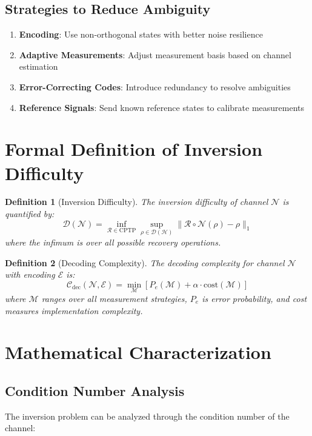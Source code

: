\documentclass[12pt]{article}
\newtheorem{definition}{Definition}
\begin{document}
\subsection{Strategies to Reduce Ambiguity}
\begin{enumerate}
    \item \textbf{Encoding}: Use non-orthogonal states with better noise resilience
    \item \textbf{Adaptive Measurements}: Adjust measurement basis based on channel estimation
    \item \textbf{Error-Correcting Codes}: Introduce redundancy to resolve ambiguities
    \item \textbf{Reference Signals}: Send known reference states to calibrate measurements
\end{enumerate}

\section{Formal Definition of Inversion Difficulty}

\begin{definition}[Inversion Difficulty]
The inversion difficulty of channel $\mathcal{N}$ is quantified by:
\[
\mathcal{D}(\mathcal{N}) = \inf_{\mathcal{R} \in \text{CPTP}} \sup_{\rho \in \mathcal{D}(\mathcal{H})} \|\mathcal{R} \circ \mathcal{N}(\rho) - \rho\|_1
\]
where the infimum is over all possible recovery operations.
\end{definition}

\begin{definition}[Decoding Complexity]
The decoding complexity for channel $\mathcal{N}$ with encoding $\mathcal{E}$ is:
\[
\mathcal{C}_{\text{dec}}(\mathcal{N}, \mathcal{E}) = \min_{\mathcal{M}} \left[ P_e(\mathcal{M}) + \alpha \cdot \text{cost}(\mathcal{M}) \right]
\]
where $\mathcal{M}$ ranges over all measurement strategies, $P_e$ is error probability, and cost measures implementation complexity.
\end{definition}

\section{Mathematical Characterization}

\subsection{Condition Number Analysis}
The inversion problem can be analyzed through the condition number of the channel:
\end{document}

